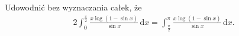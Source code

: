%

\begin{problem}[pytanie 3490404]
    \label{stack_3490404}%
    Udowodnić bez wyznaczania całek, że
    \begin{align}
        2\int_0^\frac{\pi}{2}\frac{x\log(1-\sin x)}{\sin x} \,\mathrm{d}x =
        \int_\frac{\pi}{2}^\pi\frac{x\log(1-\sin x)}{\sin x} \,\mathrm{d}x.
    \end{align}
\end{problem}

%